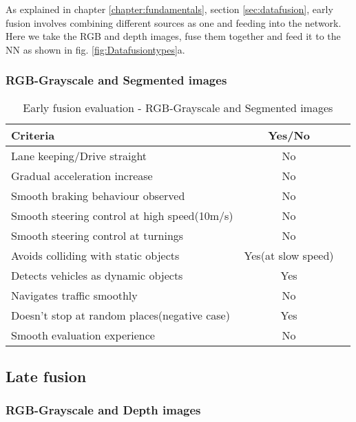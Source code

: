 As explained in chapter \ref{chapter:fundamentals}, section \ref{sec:datafusion}, early
fusion involves combining different sources as one and feeding into the network. Here we
take the RGB and depth images, fuse them together and feed it to the NN as shown in fig. \ref{fig:Datafusiontypes}a.
\subsubsection*{RGB-Grayscale and Segmented images}
\begin{table}[!ht]
    \centering
\begin{tabular}{lcc}
    \toprule
    Criteria  &  Yes/No  \\\midrule
    Lane keeping/Drive straight  & No  \\
    Gradual acceleration increase  & No\\
    Smooth braking behaviour observed & No \\
    Smooth steering control at high speed(10m/s) & No \\
    Smooth steering control at turnings & No\\
    Avoids colliding with static objects & Yes(at slow speed) \\
    Detects vehicles as dynamic objects & Yes \\
    Navigates traffic smoothly & No\\
    Doesn't stop at random places(negative case) & Yes \\
    Smooth evaluation experience & No \\\bottomrule
\end{tabular}
\caption{Early fusion evaluation - RGB-Grayscale and Segmented images}
\label{table:earlyfusionrgbseg}
\end{table}

\subsection{Late fusion}
\subsubsection*{RGB-Grayscale and Depth images}

